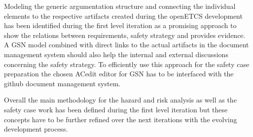 \documentclass{template/openetcs_report}
\begin{document}
Modeling the generic argumentation structure and connecting the individual elements to the respective artifacts created during the openETCS development has been identified during the first level iteration as a promising approach to show the relations between requirements, safety strategy and provides evidence. A GSN model combined with direct links to the actual artifacts in the document management system should also help the internal and external discussions concerning the safety strategy. To efficiently use this approach for the safety case preparation the  chosen ACedit editor for GSN has to be interfaced with the github document management system. 

Overall the main methodology for the hazard and risk analysis as well as the safety case work has been defined during the first level iteration but these concepts have to be further refined over the next iterations with the evolving development process.





\end{document}
